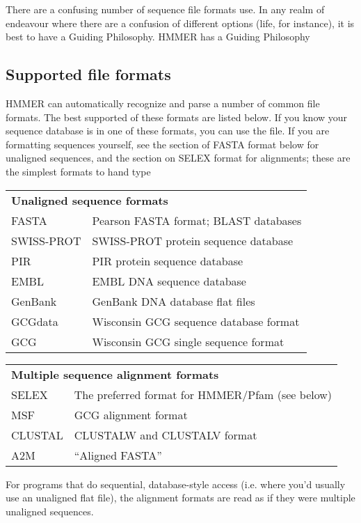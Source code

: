 There are a confusing number of sequence file formats use. In any
realm of endeavour where there are a confusion of different options
(life, for instance), it is best to have a Guiding Philosophy.  HMMER
has a Guiding Philosophy 


\subsection{Supported file formats}
 
HMMER can automatically recognize and parse a number of common file
formats. The best supported of these formats are listed below. If you
know your sequence database is in one of these formats, you can use
the file. If you are formatting sequences yourself, see the section of
FASTA format below for unaligned sequences, and the section on SELEX
format for alignments; these are the simplest formats to hand type


\begin{tabular}{ll}
\multicolumn{2}{l}{\textbf{Unaligned sequence formats}} \\
FASTA      & Pearson FASTA format; BLAST databases \\
SWISS-PROT & SWISS-PROT protein sequence database\\ 
PIR        & PIR protein sequence database \\
EMBL       & EMBL DNA sequence database \\
GenBank    & GenBank DNA database flat files\\
GCGdata    & Wisconsin GCG sequence database format \\
GCG        & Wisconsin GCG single sequence format \\
\end{tabular}

\begin{tabular}{ll}
\multicolumn{2}{l}{\textbf{Multiple sequence alignment formats}}\\
SELEX   &   The preferred format for HMMER/Pfam (see below)\\
MSF     &   GCG alignment format \\
CLUSTAL &   CLUSTALW and CLUSTALV format \\
A2M     &   ``Aligned FASTA'' \\ 
\end{tabular}

For programs that do sequential, database-style access (i.e.  where
you'd usually use an unaligned flat file), the alignment formats are
read as if they were multiple unaligned sequences.


